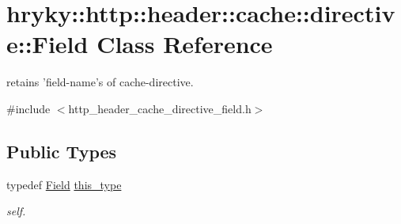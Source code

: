 \hypertarget{classhryky_1_1http_1_1header_1_1cache_1_1directive_1_1_field}{\section{hryky\-:\-:http\-:\-:header\-:\-:cache\-:\-:directive\-:\-:Field Class Reference}
\label{classhryky_1_1http_1_1header_1_1cache_1_1directive_1_1_field}
}


retains 'field-\/name's of cache-\/directive.  




{\ttfamily \#include $<$http\-\_\-header\-\_\-cache\-\_\-directive\-\_\-field.\-h$>$}

\subsection*{Public Types}
\begin{DoxyCompactItemize}
\item 
\hypertarget{classhryky_1_1http_1_1header_1_1cache_1_1directive_1_1_field_a16b4bc99411398b23b073f022a730d10}{typedef \hyperlink{classhryky_1_1http_1_1header_1_1cache_1_1directive_1_1_field}{Field} \hyperlink{classhryky_1_1http_1_1header_1_1cache_1_1directive_1_1_field_a16b4bc99411398b23b073f022a730d10}{this\-\_\-type}}\label{classhryky_1_1http_1_1header_1_1cache_1_1directive_1_1_field_a16b4bc99411398b23b073f022a730d10}

\begin{DoxyCompactList}\small\item\em self. \end{DoxyCompactList}\end{DoxyCompactItemize}
